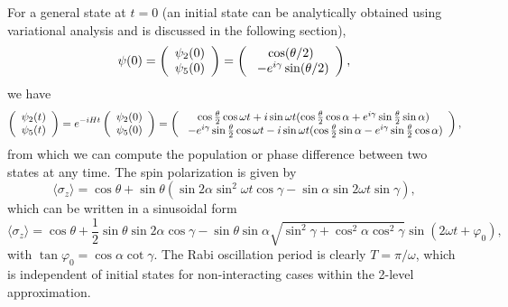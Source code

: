 \documentclass[twocolumn,prl,floatfix,citeautoscript,nofootinbib,superscriptaddress]{revtex4}
\begin{document}
For a general state at $t=0$ (an initial state can be analytically obtained
using variational analysis and is discussed in the following section),
\begin{equation*}
\psi (0)=\left( {%
\begin{array}{c}
{{\psi _{2}}(0)} \\
{{\psi _{5}}(0)}%
\end{array}%
}\right) =\left( {%
\begin{array}{c}
{\cos (\theta /2)} \\
{\ -{e^{i\gamma }}\sin (\theta /2)}%
\end{array}%
}\right) ,
\end{equation*}%
we have
\begin{equation*}
\left( {%
\begin{array}{c}
{{\psi _{2}}(t)} \\
{{\psi _{5}}(t)}%
\end{array}%
}\right) ={e^{-iHt}}\left( {%
\begin{array}{c}
{{\psi _{2}}(0)} \\
{{\psi _{5}}(0)}%
\end{array}%
}\right) =\left( {%
\begin{array}{c}
{\cos \frac{\theta }{2}\cos \omega t+i\sin \omega t(\cos \frac{\theta }{2}%
\cos \alpha +{e^{i\gamma }}\sin \frac{\theta }{2}\sin \alpha )} \\
{\ -{e^{i\gamma }}\sin \frac{\theta }{2}\cos \omega t-i\sin \omega t(\cos
\frac{\theta }{2}\sin \alpha -{e^{i\gamma }}\sin \frac{\theta }{2}\cos
\alpha )}%
\end{array}%
}\right) ,
\end{equation*}%
from which we can compute the population or phase difference between two
states at any time. The spin polarization is given by
\begin{equation*}
\langle \sigma _{z}\rangle =\cos \theta +\sin \theta \left( \sin 2\alpha
\sin ^{2}\omega t\cos \gamma -\sin \alpha \sin 2\omega t\sin \gamma \right) ,
\end{equation*}%
which can be written in a sinusoidal form
\begin{equation*}
\langle \sigma _{z}\rangle =\cos \theta +\frac{1}{2}\sin \theta \sin 2\alpha
\cos \gamma -\sin \theta \sin \alpha \sqrt{\sin ^{2}\gamma +\cos ^{2}\alpha
\cos ^{2}\gamma }\sin (2\omega t+\varphi _{0}),
\end{equation*}%
with $\tan \varphi _{0}=\cos \alpha \cot \gamma $. The Rabi oscillation
period is clearly $T=\pi /\omega $, which is independent of initial states
for non-interacting cases within the 2-level approximation.
\end{document}
